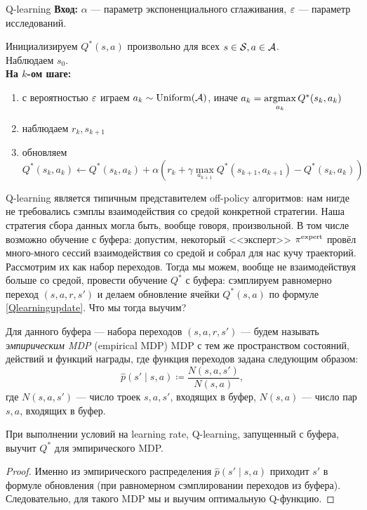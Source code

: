 \begin{algorithm}{Q-learning}
\textbf{Вход:} $\alpha$ --- параметр экспоненциального сглаживания, $\varepsilon$ --- параметр исследований.

\vspace{0.3cm}
Инициализируем $Q^*(s, a)$ произвольно для всех $s \in \mathcal{S}, a \in \mathcal{A}$. \\
Наблюдаем $s_0$. \\ 
\textbf{На $k$-ом шаге:}
\begin{enumerate}
    \item с вероятностью $\varepsilon$ играем $a_k \sim \operatorname{Uniform}(\mathcal{A})$, иначе $a_k = \mathop{\mathrm{argmax}}\limits_{a_k} Q^*(s_k, a_k)$
    \item наблюдаем $r_k, s_{k+1}$
    \item обновляем $Q^*(s_k, a_k) \leftarrow Q^*(s_k, a_k) + \alpha \left( r_k + \gamma \max\limits_{a_{k+1}} Q^*(s_{k+1}, a_{k+1}) - Q^*(s_k, a_k) \right)$
\end{enumerate}
\end{algorithm}

Q-learning является типичным представителем off-policy алгоритмов: нам нигде не требовались сэмплы взаимодействия со средой конкретной стратегии. Наша стратегия сбора данных могла быть, вообще говоря, произвольной. В том числе возможно обучение с буфера: допустим, некоторый <<эксперт>> $\pi^{\mathrm{expert}}$ провёл много-много сессий взаимодействия со средой и собрал для нас кучу траекторий. Рассмотрим их как набор переходов. Тогда мы можем, вообще не взаимодействуя больше со средой, провести обучение $Q^*$ с буфера: сэмплируем равномерно переход $(s, a, r, s')$ и делаем обновление ячейки $Q^*(s, a)$ по формуле \eqref{Qlearningupdate}. Что мы тогда выучим?

\begin{definition}
Для данного буфера --- набора переходов $(s, a, r, s')$ --- будем называть \emph{эмпирическим MDP} (empirical MDP) MDP с тем же пространством состояний, действий и функций награды, где функция переходов задана следующим образом:
$$\hat{p}(s' \mid s, a) \coloneqq \frac{N(s, a, s')}{N(s, a)},$$
где $N(s, a, s')$ --- число троек $s, a, s'$, входящих в буфер, $N(s, a)$ --- число пар $s, a$, входящих в буфер.
\end{definition}

\begin{proposition}
При выполнении условий на learning rate, Q-learning, запущенный с буфера, выучит $Q^*$ для эмпирического MDP.
\begin{proof}
Именно из эмпирического распределения $\hat{p}(s' \mid s, a)$ приходит $s'$ в формуле обновления (при равномерном сэмплировании переходов из буфера). Следовательно, для такого MDP мы и выучим оптимальную Q-функцию.
\end{proof}
\end{proposition}

